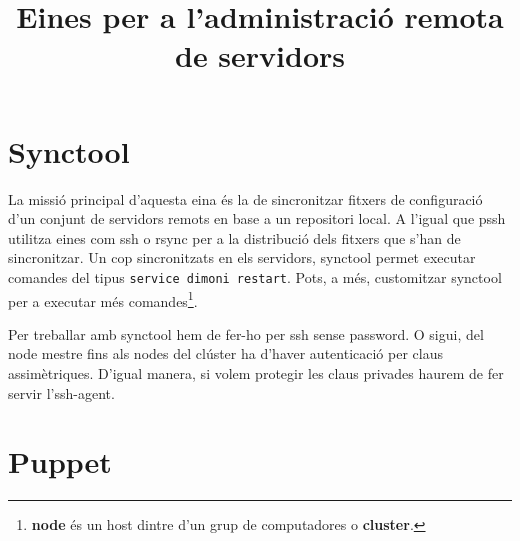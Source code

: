 \documentclass[a4paper]{article}
\begin{document}
\title{Eines per a l'administració remota de servidors}
\maketitle

\section{Synctool}
La missió principal d'aquesta eina \'es la de sincronitzar fitxers de configuració d'un conjunt de servidors remots en base a un repositori local.
A l'igual que pssh utilitza eines com ssh o rsync per a la distribució dels fitxers que s'han de sincronitzar. Un cop sincronitzats en els servidors, synctool permet executar comandes del tipus \verb+service dimoni restart+. Pots, a m\'es, customitzar synctool per a executar m\'es comandes\footnote{\textbf{node} \'es un host dintre d'un grup de computadores o \textbf{cluster}.}.

Per treballar amb synctool hem de fer-ho per ssh sense password. O sigui, del node mestre fins als nodes del clúster ha d'haver autenticació per claus assimètriques. D'igual manera, si volem protegir les claus privades haurem de fer servir l'ssh-agent.


\section{Puppet}

\end{document}
